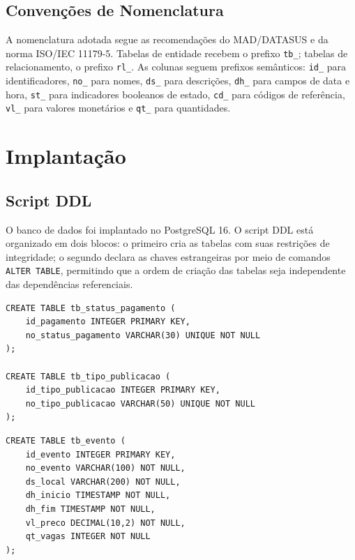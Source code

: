 \documentclass[12pt]{article}
\begin{document}
\subsection{Convenções de Nomenclatura}
\label{subsec:nomenclatura}

A nomenclatura adotada segue as recomendações do MAD/DATASUS e da norma ISO/IEC 11179-5. Tabelas de entidade recebem o prefixo \texttt{tb\_}; tabelas de relacionamento, o prefixo \texttt{rl\_}. As colunas seguem prefixos semânticos: \texttt{id\_} para identificadores, \texttt{no\_} para nomes, \texttt{ds\_} para descrições, \texttt{dh\_} para campos de data e hora, \texttt{st\_} para indicadores booleanos de estado, \texttt{cd\_} para códigos de referência, \texttt{vl\_} para valores monetários e \texttt{qt\_} para quantidades.

\section{Implantação}
\label{sec:implantacao}

\subsection{Script DDL}
\label{subsec:ddl}

O banco de dados foi implantado no PostgreSQL 16. O script DDL está organizado em dois blocos: o primeiro cria as tabelas com suas restrições de integridade; o segundo declara as chaves estrangeiras por meio de comandos \texttt{ALTER TABLE}, permitindo que a ordem de criação das tabelas seja independente das dependências referenciais.

\noindent\begin{minipage}{\linewidth}
\begin{lstlisting}[caption={DDL --- tabelas de domínio \texttt{tb\_status\_pagamento} e \texttt{tb\_tipo\_publicacao}.}, label={lst:ddl-dominio}]
CREATE TABLE tb_status_pagamento (
    id_pagamento INTEGER PRIMARY KEY,
    no_status_pagamento VARCHAR(30) UNIQUE NOT NULL
);

CREATE TABLE tb_tipo_publicacao (
    id_tipo_publicacao INTEGER PRIMARY KEY,
    no_tipo_publicacao VARCHAR(50) UNIQUE NOT NULL
);
\end{lstlisting}
\end{minipage}

\noindent\begin{minipage}{\linewidth}
\begin{lstlisting}[caption={DDL --- entidade \texttt{tb\_evento}.}, label={lst:ddl-evento}]
CREATE TABLE tb_evento (
    id_evento INTEGER PRIMARY KEY,
    no_evento VARCHAR(100) NOT NULL,
    ds_local VARCHAR(200) NOT NULL,
    dh_inicio TIMESTAMP NOT NULL,
    dh_fim TIMESTAMP NOT NULL,
    vl_preco DECIMAL(10,2) NOT NULL,
    qt_vagas INTEGER NOT NULL
);
\end{lstlisting}
\end{minipage}
\end{document}
